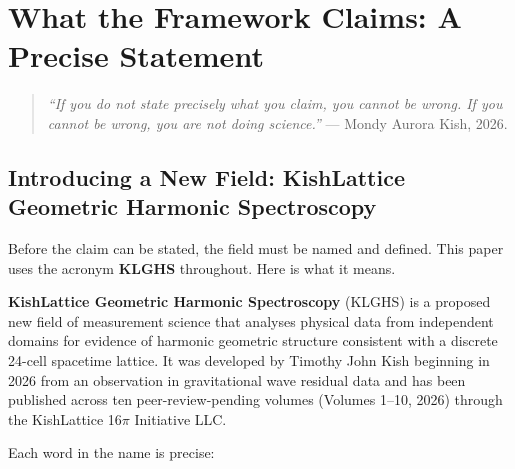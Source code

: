 \documentclass[11pt, letterpaper, openany]{book}
\begin{document}
\clearpage
\chapter{What the Framework Claims: A Precise Statement}

\begin{quote}
\textit{``If you do not state precisely what you claim, you cannot be
wrong. If you cannot be wrong, you are not doing science.''} ---
Mondy Aurora Kish, 2026.
\end{quote}


\section{Introducing a New Field: KishLattice Geometric Harmonic Spectroscopy}

Before the claim can be stated, the field must be named and defined.
This paper uses the acronym \textbf{KLGHS} throughout. Here is what
it means.

\textbf{KishLattice Geometric Harmonic Spectroscopy} (KLGHS) is a
proposed new field of measurement science that analyses physical data
from independent domains for evidence of harmonic geometric structure
consistent with a discrete 24-cell spacetime lattice. It was developed
by Timothy John Kish beginning in 2026 from an observation in
gravitational wave residual data and has been published across ten
peer-review-pending volumes (Volumes 1--10, 2026) through the
KishLattice 16$\pi$ Initiative LLC.

Each word in the name is precise:
\end{document}
